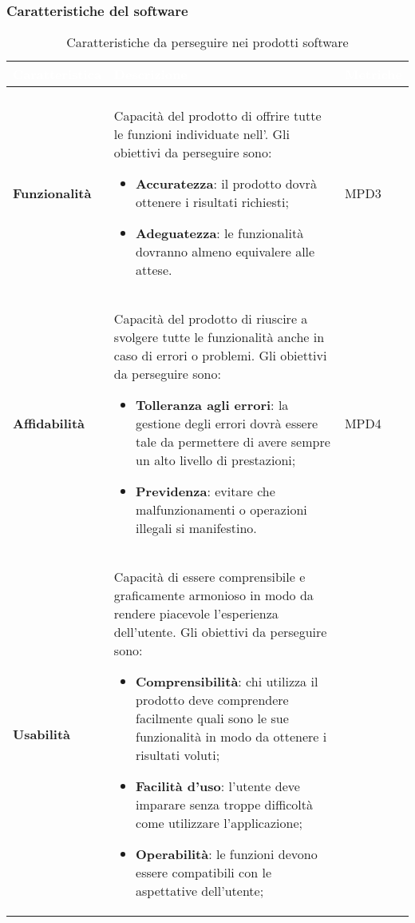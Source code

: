 \subsubsection{Caratteristiche del software}
\renewcommand{\arraystretch}{1.5}
\begin{longtable}{C{3cm} C{9.5cm} C{2.5cm}}
\textcolor{white}{\textbf{Caratteristica}}&
\textcolor{white}{\textbf{Descrizione}}&
\textcolor{white}{\textbf{Metriche}} \\
\endfirsthead
{}\\
\endfoot
{}\caption{Caratteristiche da perseguire nei prodotti software}
\endlastfoot
	
	\textbf{Funzionalità} & 
	Capacità del prodotto di offrire tutte le funzioni individuate nell'\AdRv{}. Gli obiettivi da perseguire sono:
	\begin{itemize}
		\item \textbf{Accuratezza}: il prodotto dovrà ottenere i risultati richiesti;
		\item \textbf{Adeguatezza}: le funzionalità dovranno almeno equivalere alle attese.
	\end{itemize} &
	MPD3 \\
	\textbf{Affidabilità} &
	 Capacità del prodotto di riuscire a svolgere tutte le funzionalità anche in caso di errori o problemi. Gli obiettivi da perseguire sono:
	 \begin{itemize}
		\item \textbf{Tolleranza agli errori}: la gestione degli errori dovrà essere tale da permettere di avere sempre un alto livello di prestazioni;
		\item \textbf{Previdenza}: evitare che malfunzionamenti o operazioni illegali si manifestino.
	\end{itemize} &
	MPD4 \\
	\textbf{Usabilità} &
	Capacità di essere comprensibile e graficamente armonioso in modo da rendere piacevole l'esperienza dell'utente. Gli obiettivi da perseguire sono: 
		\begin{itemize}
		\item \textbf{Comprensibilità}: chi utilizza il prodotto deve comprendere facilmente quali sono le sue funzionalità in modo da ottenere i risultati voluti;
		\item \textbf{Facilità d'uso}: l'utente deve imparare senza troppe difficoltà come utilizzare l'applicazione;
		\item \textbf{Operabilità}: le funzioni devono essere compatibili con le aspettative dell'utente;

\end{itemize}
\end{longtable}
